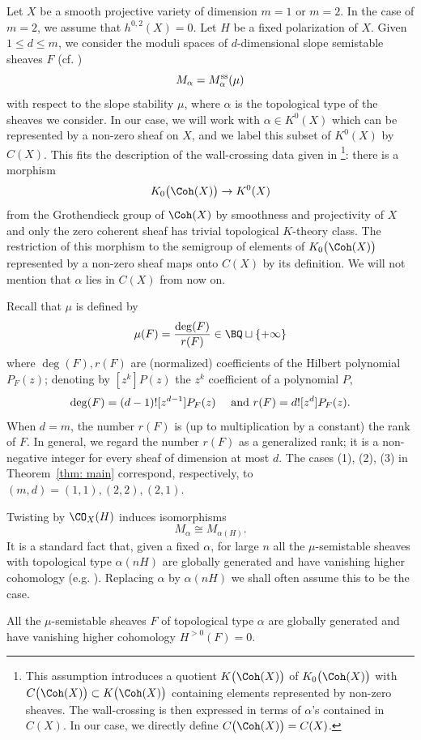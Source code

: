 Let $X$ be a smooth projective variety of dimension $m=1$ or $m=2$. In the case of $m=2$, we assume that $h^{0,2}(X)=0$. Let $H$ be a fixed polarization of $X$. Given $1\leq d\leq m$, we consider the moduli spaces of $d$-dimensional slope semistable sheaves $F$ (cf. \cite[Theorem 4.3.4, Definition 8.2.7]{HL})
$$M_\alpha=M_\alpha^{\textup{ss}}(\mu)$$
with respect to the slope stability $\mu$, where $\alpha$ is the topological type of the sheaves we consider. In our case, we will work with $\alpha \in K^0(X)$ which can be represented by a non-zero sheaf on $X$, and we label this subset of $K^0(X)$ by $C(X)$. This fits the description of the wall-crossing data given in \cite[Assumption 5.1 (b)]{Jo21}\footnote{This assumption introduces a quotient $K\big(\Coh(X)\big)$ of $K_0\big(\Coh(X)\big)$  with $C\big(\Coh(X)\big)\subset K\big(\Coh(X)\big)$ containing elements represented by non-zero sheaves. The wall-crossing is then expressed in terms of $\alpha$'s contained in $C(X)$. In our case, we directly define $C\big(\Coh(X)\big) =C(X)$.}: there is a morphism
$$
K_{0}\big(\Coh(X)\big)\to K^0(X)
$$
from the Grothendieck group of $\Coh(X)$ by smoothness and projectivity of $X$ and only the zero coherent sheaf has trivial topological $K$-theory class. The restriction of this morphism to the semigroup of elements of $K_{0}\big(\Coh(X)\big)$ represented by a non-zero sheaf maps onto $C(X)$ by its definition. We will not mention that $\alpha$ lies in $C(X)$ from now on.

Recall that $\mu$ is defined by
\[\mu(F)=\frac{\deg(F)}{r(F)}\in \BQ\sqcup\{+\infty\}\]
where $\deg(F), r(F)$ are (normalized) coefficients of the Hilbert polynomial $P_F(z)$; denoting by $[z^k]P(z)$ the $z^k$ coefficient of a polynomial $P$,
\[\deg(F)=(d-1)![z^{d-1}]P_F(z) \quad \textup{ and } r(F)=d![z^{d}]P_F(z).\]
When $d=m$, the number $r(F)$ is (up to multiplication by a constant) the rank of $F$. In general, we regard the number $r(F)$ as a generalized rank; it is a non-negative integer for every sheaf of dimension at most $d$. The cases (1), (2), (3) in Theorem~\ref{thm: main} correspond, respectively, to $(m,d)=(1,1), (2,2), (2,1)$.

Twisting by $\CO_X(H)$ induces isomorphisms
\[M_\alpha\cong M_{\alpha(H)}.\]
It is a standard fact that, given a fixed $\alpha$, for large $n$ all the $\mu$-semistable sheaves with topological type $\alpha(nH)$ are globally generated and have vanishing higher cohomology (e.g. \cite[Corollary 1.7.7]{HL}). Replacing $\alpha$ by $\alpha(nH)$ we shall often assume this to be the case.
\begin{assumption}
\notready\label{ass: alphabig}
All the $\mu$-semistable sheaves $F$ of topological type $\alpha$ are globally generated and have vanishing higher cohomology $H^{>0}(F)=0$.
\end{assumption}



